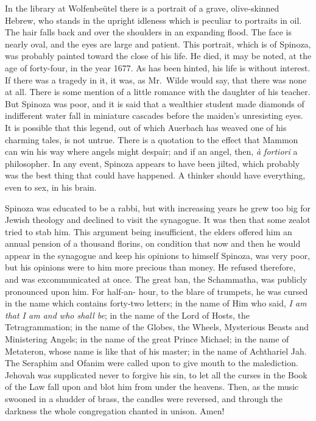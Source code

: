 \documentclass[]{book}
\begin{document}
In the library at Wolfenbeütel there is a portrait of a grave,
olive-skinned Hebrew, who stands in the upright idleness which is
peculiar to portraits in oil. The hair falls back and over the shoulders
in an expanding flood. The face is nearly oval, and the eyes are large
and patient. This portrait, which is of Spinoza, was probably painted
toward the close of his life. He died, it may be noted, at the age of
forty-four, in the year 1677. As has been hinted, his life is without
interest. If there was a tragedy in it, it was, as Mr.~Wilde would say,
that there was none at all. There is some mention of a little romance
with the daughter of his teacher. But Spinoza was poor, and it is said
that a wealthier student made diamonds of indifferent water fall in
miniature cascades before the maiden's unresisting eyes. It is possible
that this legend, out of which Auerbach has weaved one of his charming
tales, is not untrue. There is a quotation to the effect that Mammon can
win his way where angels might despair; and if an angel, then, \emph{à
fortiori} a philosopher. In any event, Spinoza appears to have been
jilted, which probably was the best thing that could have happened. A
thinker should have everything, even to sex, in his brain.

Spinoza was educated to be a rabbi, but with increasing years he grew
too big for Jewish theology and declined to visit the synagogue. It was
then that some zealot tried to stab him. This argument being
insufficient, the elders offered him an annual pension of a thousand
florins, on condition that now and then he would appear in the synagogue
and keep his opinions to himself Spinoza, was very poor, but his
opinions were to him more precious than money. He refused therefore, and
was excommunicated at once. The great ban, the Schammatha, was publicly
pronounced upon him. For half-an- hour, to the blare of trumpets, he was
cursed in the name which contains forty-two letters; in the name of Him
who said, \emph{I am that I am and who shall be}; in the name of the
Lord of Hosts, the Tetragrammation; in the name of the Globes, the
Wheels, Mysterious Beasts and Ministering Angels; in the name of the
great Prince Michael; in the name of Metateron, whose name is like that
of his master; in the name of Achthariel Jah. The Seraphim and Ofanim
were called upon to give mouth to the malediction. Jehovah was
supplicated never to forgive his sin, to let all the curses in the Book
of the Law fall upon and blot him from under the heavens. Then, as the
music swooned in a shudder of brass, the candles were reversed, and
through the darkness the whole congregation chanted in unison. Amen!
\end{document}
